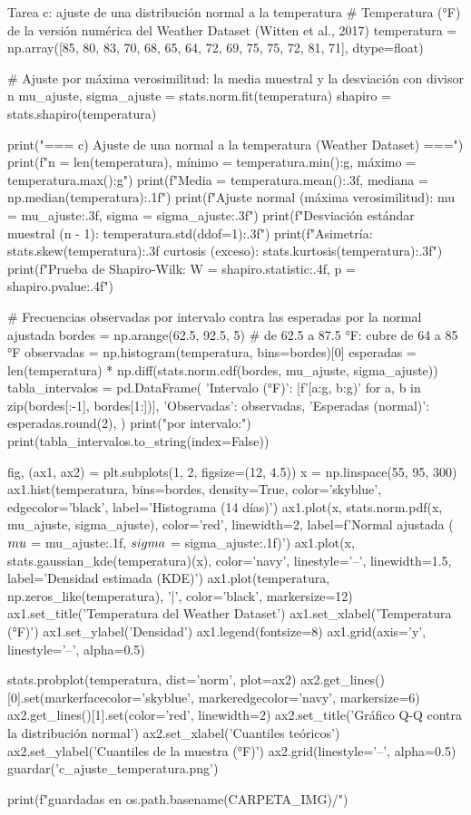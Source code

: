 \documentclass[11pt,letterpaper]{article}
\begin{document}
\begin{codigo}[label=cod:c]{Tarea c: ajuste de una distribución normal a la temperatura}
# Temperatura (°F) de la versión numérica del Weather Dataset (Witten et al., 2017)
temperatura = np.array([85, 80, 83, 70, 68, 65, 64, 72, 69, 75, 75, 72, 81, 71], dtype=float)

# Ajuste por máxima verosimilitud: la media muestral y la desviación con divisor n
mu_ajuste, sigma_ajuste = stats.norm.fit(temperatura)
shapiro = stats.shapiro(temperatura)

print("\n=== c) Ajuste de una normal a la temperatura (Weather Dataset) ===")
print(f"n = {len(temperatura)}, mínimo = {temperatura.min():g}, máximo = {temperatura.max():g}")
print(f"Media = {temperatura.mean():.3f}, mediana = {np.median(temperatura):.1f}")
print(f"Ajuste normal (máxima verosimilitud): mu = {mu_ajuste:.3f}, sigma = {sigma_ajuste:.3f}")
print(f"Desviación estándar muestral (n - 1): {temperatura.std(ddof=1):.3f}")
print(f"Asimetría: {stats.skew(temperatura):.3f}   curtosis (exceso): {stats.kurtosis(temperatura):.3f}")
print(f"Prueba de Shapiro-Wilk: W = {shapiro.statistic:.4f}, p = {shapiro.pvalue:.4f}")

# Frecuencias observadas por intervalo contra las esperadas por la normal ajustada
bordes = np.arange(62.5, 92.5, 5)  # de 62.5 a 87.5 °F: cubre de 64 a 85 °F
observadas = np.histogram(temperatura, bins=bordes)[0]
esperadas = len(temperatura) * np.diff(stats.norm.cdf(bordes, mu_ajuste, sigma_ajuste))
tabla_intervalos = pd.DataFrame({
    'Intervalo (°F)': [f'[{a:g}, {b:g})' for a, b in zip(bordes[:-1], bordes[1:])],
    'Observadas': observadas,
    'Esperadas (normal)': esperadas.round(2),
})
print("\nFrecuencias por intervalo:")
print(tabla_intervalos.to_string(index=False))

fig, (ax1, ax2) = plt.subplots(1, 2, figsize=(12, 4.5))
x = np.linspace(55, 95, 300)
ax1.hist(temperatura, bins=bordes, density=True, color='skyblue', edgecolor='black',
         label='Histograma (14 días)')
ax1.plot(x, stats.norm.pdf(x, mu_ajuste, sigma_ajuste), color='red', linewidth=2,
         label=f'Normal ajustada ($\\mu$ = {mu_ajuste:.1f}, $\\sigma$ = {sigma_ajuste:.1f})')
ax1.plot(x, stats.gaussian_kde(temperatura)(x), color='navy', linestyle='--', linewidth=1.5,
         label='Densidad estimada (KDE)')
ax1.plot(temperatura, np.zeros_like(temperatura), '|', color='black', markersize=12)
ax1.set_title('Temperatura del Weather Dataset')
ax1.set_xlabel('Temperatura (°F)')
ax1.set_ylabel('Densidad')
ax1.legend(fontsize=8)
ax1.grid(axis='y', linestyle='--', alpha=0.5)

stats.probplot(temperatura, dist='norm', plot=ax2)
ax2.get_lines()[0].set(markerfacecolor='skyblue', markeredgecolor='navy', markersize=6)
ax2.get_lines()[1].set(color='red', linewidth=2)
ax2.set_title('Gráfico Q-Q contra la distribución normal')
ax2.set_xlabel('Cuantiles teóricos')
ax2.set_ylabel('Cuantiles de la muestra (°F)')
ax2.grid(linestyle='--', alpha=0.5)
guardar('c_ajuste_temperatura.png')

print(f"\nFiguras guardadas en {os.path.basename(CARPETA_IMG)}/")
\end{codigo}
\end{document}
